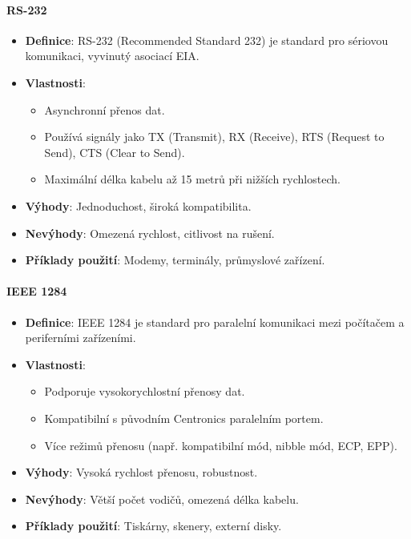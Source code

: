 \paragraph{RS-232}
\begin{itemize}
    \item \textbf{Definice}: RS-232 (Recommended Standard 232) je standard pro sériovou komunikaci, vyvinutý asociací EIA.
    \item \textbf{Vlastnosti}:
    \begin{itemize}
        \item Asynchronní přenos dat.
        \item Používá signály jako TX (Transmit), RX (Receive), RTS (Request to Send), CTS (Clear to Send).
        \item Maximální délka kabelu až 15 metrů při nižších rychlostech.
    \end{itemize}
    \item \textbf{Výhody}: Jednoduchost, široká kompatibilita.
    \item \textbf{Nevýhody}: Omezená rychlost, citlivost na rušení.
    \item \textbf{Příklady použití}: Modemy, terminály, průmyslové zařízení.
\end{itemize}

\paragraph{IEEE 1284}
\begin{itemize}
    \item \textbf{Definice}: IEEE 1284 je standard pro paralelní komunikaci mezi počítačem a periferními zařízeními.
    \item \textbf{Vlastnosti}:
    \begin{itemize}
        \item Podporuje vysokorychlostní přenosy dat.
        \item Kompatibilní s původním Centronics paralelním portem.
        \item Více režimů přenosu (např. kompatibilní mód, nibble mód, ECP, EPP).
    \end{itemize}
    \item \textbf{Výhody}: Vysoká rychlost přenosu, robustnost.
    \item \textbf{Nevýhody}: Větší počet vodičů, omezená délka kabelu.
    \item \textbf{Příklady použití}: Tiskárny, skenery, externí disky.
\end{itemize}

